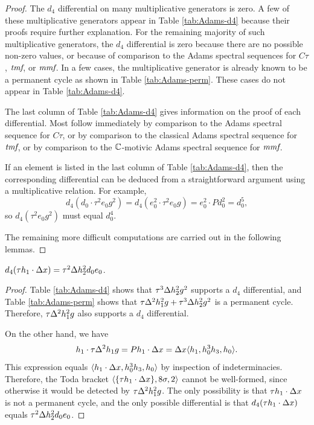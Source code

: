 \begin{proof}
The $d_4$ differential on many multiplicative generators is zero.
A few of these multiplicative generators appear
in Table \ref{tab:Adams-d4} because their proofs require further
explanation.
For the remaining majority of such multiplicative generators,
the $d_4$ differential is zero
because there are no possible non-zero values, 
or because of comparison to the Adams spectral sequences for $C\tau$,
$\textit{tmf}$, or $\textit{mmf}$.
In a few cases, the multiplicative generator
is already known to be a permanent cycle as shown in
Table \ref{tab:Adams-perm}.
These cases do not appear in Table \ref{tab:Adams-d4}.

The last column of Table \ref{tab:Adams-d4} gives information on the
proof of each differential.
Most follow immediately by comparison to
the Adams spectral sequence for $C\tau$, or
by comparison to the classical Adams spectral sequence for $\textit{tmf}$, or
by comparison to the $\mathbb{C}$-motivic Adams spectral sequence for $\textit{mmf}$.

If an element is listed in the last column of Table \ref{tab:Adams-d4}, 
then the corresponding differential can be deduced from a straightforward
argument using a multiplicative relation.  For example, 
\[
d_4( d_0 \cdot \tau^2 e_0 g^2 ) =
d_4( e_0^2 \cdot \tau^2 e_0 g) = 
e_0^2 \cdot P d_0^2 = d_0^5,
\]
so $d_4(\tau^2 e_0 g^2)$ must equal $d_0^4$.

The remaining more difficult computations are carried out in the
following lemmas.
\end{proof}




\begin{lemma}
\label{lem:d4-th1.Dx}
$d_4(\tau h_1 \cdot \Delta x) = \tau^2 \Delta h_2^2 d_0 e_0$.
\end{lemma}


\begin{proof}
Table \ref{tab:Adams-d4} shows that $\tau^3 \Delta h_2^2 g^2$ supports a $d_4$ differential, and 
Table \ref{tab:Adams-perm} shows that 
$\tau \Delta^2 h_1^2 g + \tau^3 \Delta h_2^2 g^2$ is a permanent cycle.
Therefore,
$\tau \Delta^2 h_1^2 g$ also supports a $d_4$ differential.

On the other hand, we have
\[
h_1 \cdot \tau \Delta^2 h_1 g = P h_1 \cdot \Delta x =
\Delta x \langle h_1, h_0^3 h_3, h_0 \rangle.
\]
This expression equals $\langle h_1 \cdot \Delta x, h_0^3 h_3, h_0 \rangle$
by inspection of indeterminacies.
Therefore, the Toda bracket
$\langle \{ \tau h_1 \cdot \Delta x \}, 8 \sigma, 2 \rangle$
cannot be well-formed, since otherwise it would be detected
by $\tau \Delta^2 h_1^2 g$.
The only possibility is that 
$\tau h_1 \cdot \Delta x$ is not a permanent cycle, and the
only possible differential is that
$d_4(\tau h_1 \cdot \Delta x)$ equals $\tau^2 \Delta h_2^2 d_0 e_0$.
\end{proof}


